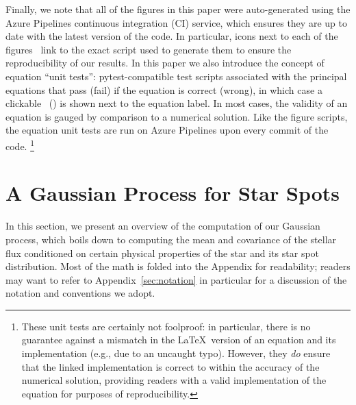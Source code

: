 \documentclass[modern]{aastex62}
\begin{document}
Finally, we note that all of the figures in this paper were auto-generated
using the Azure Pipelines continuous integration (CI) service, which
ensures they are up to date with the latest version of the
\starryprocess code. In particular, icons next to each of the figures \codeicon \,
link to the exact script used to generate them to ensure the reproducibility
of our results. In this paper we also introduce the concept of equation
``unit tests'': \textsf{pytest}-compatible test scripts associated
with the principal equations that pass (fail) if the equation is correct (wrong),
in which case a clickable \testpassicon \, (\testfailicon) is shown next to the equation
label.
In most cases, the validity of an equation is gauged by comparison to
a numerical solution. Like the figure scripts, the equation unit tests are
run on Azure Pipelines upon every commit of the code.%
\footnote{
    These unit tests are certainly not foolproof: in particular, there is
    no guarantee against a mismatch in the \LaTeX \, version of an equation
    and its \Python implementation (e.g., due to an uncaught typo). However, they
    \emph{do} ensure that the linked \Python implementation is correct to
    within the accuracy of the numerical solution, providing readers with a
    valid implementation of the equation for purposes of reproducibility.
}


\section{A Gaussian Process for Star Spots}
\label{sec:main}

In this section, we present an overview of the computation of our Gaussian
process, which boils down to computing the mean and covariance of the stellar
flux conditioned on certain physical properties of the star and its star spot
distribution. Most of the math is folded into the Appendix for readability;
readers may want to refer to Appendix~\ref{sec:notation} in particular for
a discussion of the notation and conventions we adopt.
\end{document}
